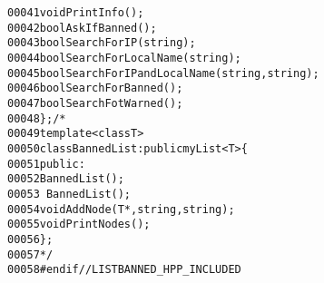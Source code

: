 \begin{footnotesize}
\begin{alltt}
00041         \textcolor{keywordtype}{void} PrintInfo();
00042         \textcolor{keywordtype}{bool} AskIfBanned();
00043         \textcolor{keywordtype}{bool} SearchForIP(\textcolor{keywordtype}{string});
00044         \textcolor{keywordtype}{bool} SearchForLocalName(\textcolor{keywordtype}{string});
00045         \textcolor{keywordtype}{bool} SearchForIPandLocalName(\textcolor{keywordtype}{string},\textcolor{keywordtype}{string});
00046         \textcolor{keywordtype}{bool} SearchForBanned();
00047         \textcolor{keywordtype}{bool} SearchFotWarned();
00048 \};\textcolor{comment}{/*}
00049 \textcolor{comment}{template <class T>}
00050 \textcolor{comment}{class BannedList: public myList<T>\{}
00051 \textcolor{comment}{    public:}
00052 \textcolor{comment}{        BannedList();}
00053 \textcolor{comment}{        ~BannedList();}
00054 \textcolor{comment}{        void AddNode(T*,string,string);}
00055 \textcolor{comment}{        void PrintNodes();}
00056 \textcolor{comment}{\};}
00057 \textcolor{comment}{*/}
00058 \textcolor{preprocessor}{#endif // LISTBANNED\_HPP\_INCLUDED}
\end{alltt}\end{footnotesize}
